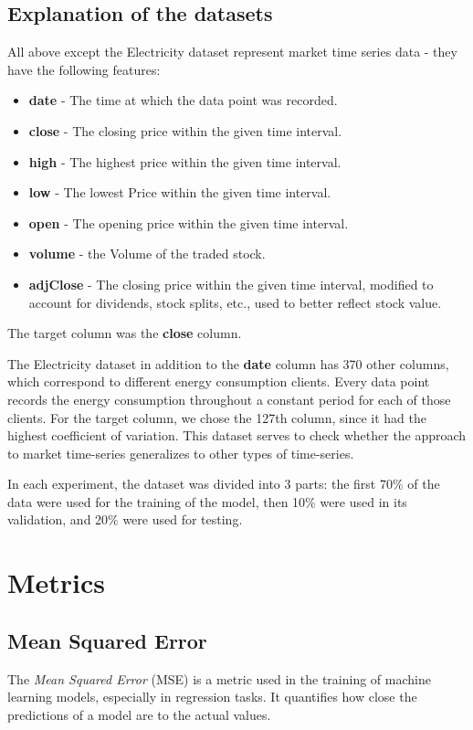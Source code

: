 \subsection{Explanation of the datasets}
All above except the Electricity dataset represent market time series data - they have the following features:
\begin{itemize}
	\item \textbf{date} - The time at which the data point was recorded.
	\item \textbf{close} - The closing price within the given time interval.
	\item \textbf{high} - The highest price within the given time interval.
	\item \textbf{low} - The lowest Price within the given time interval.
	\item \textbf{open} - The opening price within the given time interval.
	\item \textbf{volume} - the Volume of the traded stock.
	\item \textbf{adjClose} - The closing price within the given time interval, modified to account for dividends, stock splits, etc., used to better reflect stock value.
\end{itemize}
The target column was the \textbf{close} column.

The Electricity dataset in addition to the \textbf{date} column has 370 other columns, which correspond to different energy consumption clients. Every data point records the energy consumption throughout a constant period for each of those clients. For the target column, we chose the 127th column, since it had the highest coefficient of variation.
This dataset serves to check whether the approach to market time-series generalizes to other types of time-series.

In each experiment, the dataset was divided into 3 parts: the first 70\% of the data were used for the training of the model, then 10\% were used in its validation, and 20\% were used for testing.


\section{Metrics}

\subsection{Mean Squared Error}
The \emph{Mean Squared Error} (MSE) is a metric used in the training of machine learning models, especially in regression tasks. It quantifies how close the predictions of a model are to the actual values.


